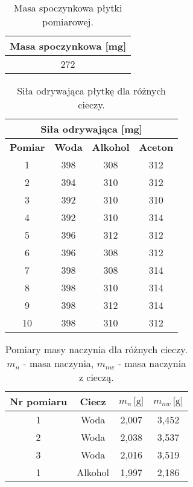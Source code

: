 \documentclass[a4paper,12pt]{article}
\begin{document}
\begin{table}[H]
    \centering
    \begin{tabular}{|c|}
        \hline

        \textbf{Masa spoczynkowa [mg]} \\
        \hline
        272 \\
        \hline
    \end{tabular}
    \caption{Masa spoczynkowa płytki pomiarowej.}
    \label{tab:masa_spoczynkowa}
\end{table}

\begin{table}[H]
    \centering
    \begin{tabular}{|c|c|c|c|}
        \hline
        \multicolumn{4}{|c|}{\textbf{Siła odrywająca [mg]}} \\
        \hline
        \textbf{Pomiar} & \textbf{Woda} & \textbf{Alkohol} & \textbf{Aceton}
        \\
        \hline
        1 & 398 & 308 & 312 \\ %
        \hline
        2 & 394 & 310 & 312 \\ %
        \hline
        3 & 392 & 310 & 310 \\ %
        \hline
        4 & 392 & 310 &
        314 \\ %
        \hline
        5 & 396 & 312 & 312 \\ %
        \hline
        6 & 396 & 308 & 312 \\ %
        \hline
        7 & 398 & 308 & 314 \\ %
        \hline
        8 &
        398 & 310 & 314 \\ %
        \hline
        9 & 398 & 312 & 314 \\ %
        \hline
        10 & 398 & 310 & 312 \\ %
        \hline
    \end{tabular}
    \caption{Siła odrywająca płytkę dla różnych cieczy.}
    \label{tab:sila_odrywania}
\end{table}

\begin{table}[H]
    \centering
    \begin{tabular}{|c|c|c|c|}

        \hline
        \textbf{Nr pomiaru} & \textbf{Ciecz} & $m_n\,\text{[g]}$ & $m_{nw}\,\text{[g]}$ \\
        \hline
        1 & Woda & 2{,}007 & 3{,}452 \\
        2 & Woda & 2{,}038 & 3{,}537 \\
        3 & Woda & 2{,}016 & 3{,}519 \\
        \hline
        1 & Alkohol & 1{,}997 & 2{,}186 \\

        \hline
    \end{tabular}
    \caption{Pomiary masy naczynia dla różnych cieczy.
        $m_n$ - masa naczynia, $m_{nw}$ - masa naczynia z cieczą.}
    \label{tab:stalagmometr}
\end{table}
\end{document}
